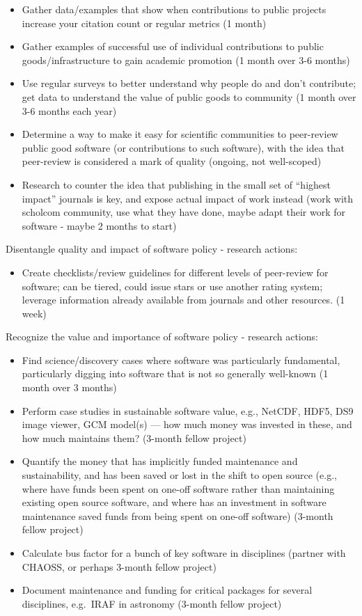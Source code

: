\documentclass[
]{book}
\providecommand{\tightlist}{%
  \setlength{\itemsep}{0pt}\setlength{\parskip}{0pt}}
\begin{document}
\begin{itemize}
\item
  Gather data/examples that show when contributions to public projects increase your citation
  count or regular metrics (1 month)
\item
  Gather examples of successful use of individual contributions to public goods/infrastructure
  to gain academic promotion (1 month over 3-6 months)
\item
  Use regular surveys to better understand why people do and don't contribute; get data to
  understand the value of public goods to community (1 month over 3-6 months each year)
\item
  Determine a way to make it easy for scientific communities to peer-review public good software
  (or contributions to such software), with the idea that peer-review is considered a mark of
  quality (ongoing, not well-scoped)
\item
  Research to counter the idea that publishing in the small set of ``highest impact'' journals is
  key, and expose actual impact of work instead (work with scholcom community, use what they have
  done, maybe adapt their work for software - maybe 2 months to start)
\end{itemize}

Disentangle quality and impact of software policy - research actions:

\begin{itemize}
\tightlist
\item
  Create checklists/review guidelines for different levels of peer-review for software; can be
  tiered, could issue stars or use another rating system; leverage information already available
  from journals and other resources. (1 week)
\end{itemize}

Recognize the value and importance of software policy - research actions:

\begin{itemize}
\item
  Find science/discovery cases where software was particularly fundamental, particularly digging
  into software that is not so generally well-known (1 month over 3 months)
\item
  Perform case studies in sustainable software value, e.g., NetCDF, HDF5, DS9 image viewer, GCM
  model(s) --- how much money was invested in these, and how much maintains them? (3-month fellow project)
\item
  Quantify the money that has implicitly funded maintenance and sustainability, and has been saved
  or lost in the shift to open source (e.g., where have funds been spent on one-off software rather
  than maintaining existing open source software, and where has an investment in software maintenance
  saved funds from being spent on one-off software) (3-month fellow project)
\item
  Calculate bus factor for a bunch of key software in disciplines (partner with CHAOSS, or perhaps
  3-month fellow project)
\item
  Document maintenance and funding for critical packages for several disciplines, e.g.~IRAF in astronomy
  (3-month fellow project)
\end{itemize}
\end{document}

